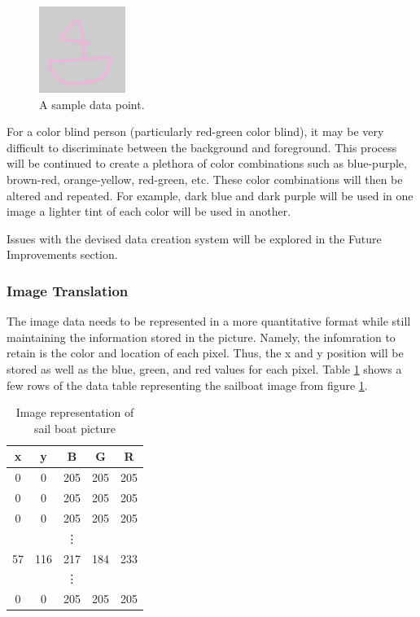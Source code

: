 \documentclass[12pt]{article}
\begin{document}
\begin{figure}[H]
	\centering
	\includegraphics[width=0.25\textwidth]{img/data2.png}
	\caption{A sample data point.}
	\label{fig:data1}
\end{figure}

For a color blind person (particularly red-green color blind), it may be very difficult to discriminate between the background and foreground. This process will be continued to create a plethora of color combinations such as blue-purple, brown-red, orange-yellow, red-green, etc. These color combinations will then be altered and repeated. For example, dark blue and dark purple will be used in one image a lighter tint of each color will be used in another.

Issues with the devised data creation system will be explored in the Future Improvements section.

\subsubsection{Image Translation}
The image data needs to be represented in a more quantitative format while still maintaining the information stored in the picture. Namely, the infomration to retain is the color and location of each pixel. Thus, the x and y position will be stored as well as the blue, green, and red values for each pixel. Table \ref{table:1} shows a few rows of the data table representing the sailboat image from figure \ref{fig:data1}. 

\begin{table}[H]
	\centering
	\begin{tabular}{ c c c c c}
		x & y & B & G & R \\\hline 
		0 & 0 & 205 & 205 & 205 \\  
		0 & 0 & 205 & 205 & 205 \\
		0 & 0 & 205 & 205 & 205 \\    
		&  & \vdots &  &  \\ 
		57 & 116 & 217 & 184 &233\\
		&  & \vdots &  &  \\ 
		0 & 0 & 205 & 205 & 205 \\		
	\end{tabular}
	\caption{Image representation of sail boat picture}
	\label{table:1}
\end{table}
\end{document}
